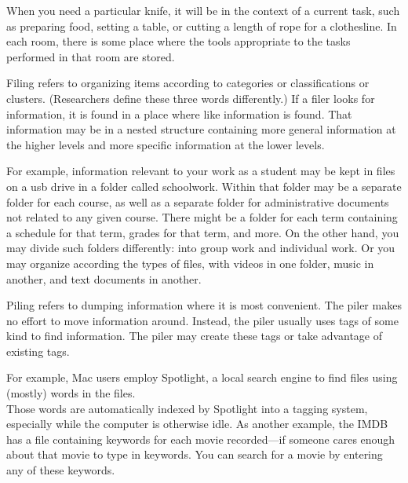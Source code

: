When you need a particular knife, it will be in the context of a current
task, such as preparing food, setting a table, or cutting a length of
rope for a clothesline. In each room, there is some place where the
tools appropriate to the tasks performed in that room are stored.

\hypertarget{filing-using-hierarchies-to-organize-information}{%
\label{filing-using-hierarchies-to-organize-information}}

Filing refers to organizing items according to categories or
classifications or clusters. (Researchers define these three words
differently.) If a filer looks for information, it is found in a place
where like information is found. That information may be in a nested
structure containing more general information at the higher levels and
more specific information at the lower levels.

For example, information relevant to your work as a student may be kept
in files on a usb drive in a folder called schoolwork. Within that
folder may be a separate folder for each course, as well as a separate
folder for administrative documents not related to any given course.
There might be a folder for each term containing a schedule for that
term, grades for that term, and more. On the other hand, you may divide
such folders differently: into group work and individual work. Or you
may organize according the types of files, with videos in one folder,
music in another, and text documents in another.

\hypertarget{piling-using-tags-to-organize-information}{%
\label{piling-using-tags-to-organize-information}}

Piling refers to dumping information where it is most convenient. The
piler makes no effort to move information around. Instead, the piler
usually uses tags of some kind to find information. The piler may create
these tags or take advantage of existing tags.

For example, Mac users employ Spotlight, a local search engine to find
files using (mostly) words in the files.\\
Those words are automatically indexed by Spotlight into a tagging
system, especially while the computer is otherwise idle. As another
example, the IMDB has a file containing keywords for each movie
recorded---if someone cares enough about that movie to type in keywords.
You can search for a movie by entering any of these keywords.

